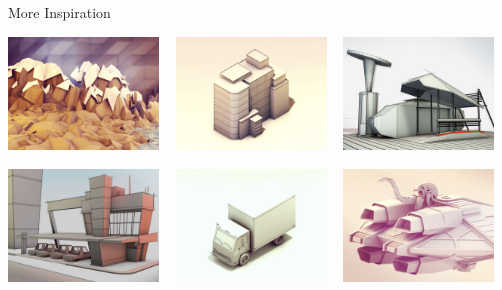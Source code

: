 \begin{frame}[plain]
\end{frame}


\begin{frame}{More Inspiration}

	\center

	\includegraphics[width=0.3\textwidth]{intro/rendering_00}
	~
	\includegraphics[width=0.3\textwidth]{intro/rendering_01}
	~
	\includegraphics[width=0.3\textwidth]{intro/rendering_02}
		
	\medskip
	
	\includegraphics[width=0.3\textwidth]{intro/rendering_05}
	~
	\includegraphics[width=0.3\textwidth]{intro/rendering_04}
	~
	\includegraphics[width=0.3\textwidth]{intro/rendering_03}
	
\end{frame}


